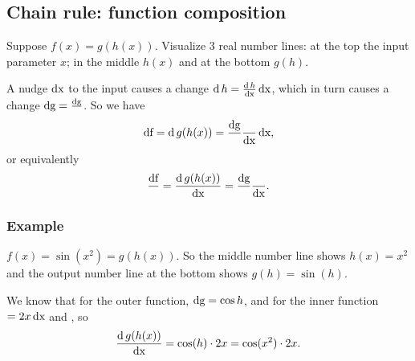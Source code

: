 \documentclass[12pt]{article}
\DeclareMathOperator{\df}{\text{df}}
\DeclareMathOperator{\dg}{\text{dg}}
\let\dh\relax\DeclareMathOperator{\dh}{\text{dh}}
\begin{document}
\subsection{Chain rule: function composition}
Suppose $f(x) = g(h(x))$. Visualize 3 real number lines: at the top the input
parameter $x$; in the middle $h(x)$ and at the bottom $g(h)$.

A nudge $\operatorname{\text{dx}}$ to the input causes a change $\operatorname{\text{d}} h = \frac{\operatorname{\text{d}} h}{\operatorname{\text{dx}}} \operatorname{\text{dx}}$, which in turn causes a
change $\dg = \frac{\dg}{\dh} \dh$. So we have
\begin{align*}
  \df = \d g(h(x)) = \frac{\dg}{\dh} \frac{\dh}{\dx} \dx,
\end{align*}
or equivalently
\begin{align*}
  \frac{\df}{\dh} = \frac{\d g(h(x))}{\dx} = \frac{\dg}{\dh} \frac{\dh}{\dx}.
\end{align*}

\subsubsection{Example}
$f(x) = \sin(x^2) = g(h(x))$. So the middle number line shows $h(x) = x^2$ and
the output number line at the bottom shows $g(h) = \sin(h)$.

We know that for the outer function, $\dg = \cos h \dh$, and for the inner
function $\dh = 2x \dx$ and , so
\begin{align*}
  \frac{\operatorname{\text{d}} g(h(x))}{\operatorname{\text{dx}}} = \cos (h) \cdot 2x = \cos(x^2)\cdot 2x.
\end{align*}
\end{document}
